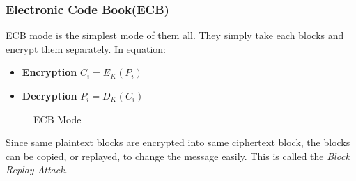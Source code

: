 \documentclass{report}
\begin{document}
			\subsubsection{Electronic Code Book(ECB)}
				ECB mode is the simplest mode of them all. They simply take each blocks and encrypt them separately. In equation:
				\begin{itemize}
					\item \textbf{Encryption} $C_i=E_K(P_i)$
					\item \textbf{Decryption} $P_i=D_K(C_i)$
				\end{itemize}
				\begin{figure}[h!]
					\centering
					 \label{fig-ECB-ENC}
					\qquad
					 \label{fig-ECB-DEC}
					\caption{ECB Mode}
					\label{fig-ECB}
				\end{figure}
				Since same plaintext blocks are encrypted into same ciphertext block, the blocks can be copied, or replayed, to change the message easily. This is called the \emph{Block Replay Attack}.
\end{document}
